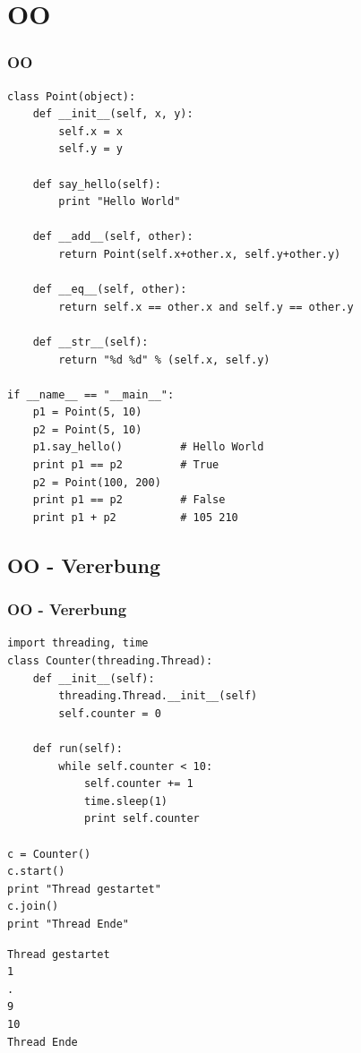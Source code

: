 \documentclass[10pt]{beamer}
\begin{document}
\section{OO}
\begin{frame}[fragile]
  \frametitle{OO}
  \begin{lstlisting}
class Point(object):
    def __init__(self, x, y):
        self.x = x
        self.y = y

    def say_hello(self):
        print "Hello World"

    def __add__(self, other):
        return Point(self.x+other.x, self.y+other.y)

    def __eq__(self, other):
        return self.x == other.x and self.y == other.y

    def __str__(self):
        return "%d %d" % (self.x, self.y)

if __name__ == "__main__":
    p1 = Point(5, 10)
    p2 = Point(5, 10)
    p1.say_hello()         # Hello World
    print p1 == p2         # True
    p2 = Point(100, 200)
    print p1 == p2         # False
    print p1 + p2          # 105 210
  \end{lstlisting}
\end{frame}

\subsection{OO - Vererbung}
\begin{frame}[fragile]
  \frametitle{OO - Vererbung}
  \begin{lstlisting}
import threading, time
class Counter(threading.Thread):
    def __init__(self):
        threading.Thread.__init__(self)
        self.counter = 0

    def run(self):
        while self.counter < 10:
            self.counter += 1
            time.sleep(1)
            print self.counter

c = Counter()
c.start()
print "Thread gestartet"
c.join()
print "Thread Ende"
  \end{lstlisting}
\begin{lstlisting}[style=SHELL]
Thread gestartet
1
.
9
10
Thread Ende 
\end{lstlisting}

\end{frame}
\end{document}

